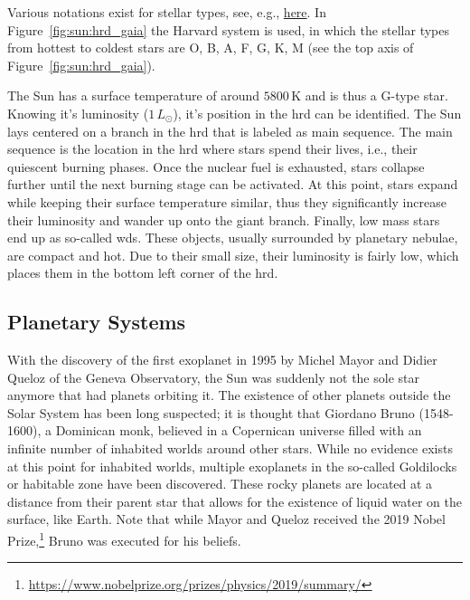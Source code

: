 Various notations exist for stellar types, see, e.g., \href{https://en.wikipedia.org/wiki/Stellar_classification}{here}. In Figure~\ref{fig:sun:hrd_gaia} the Harvard system is used, in which the stellar types from hottest to coldest stars are O, B, A, F, G, K, M (see the top axis of Figure~\ref{fig:sun:hrd_gaia}).

The Sun has a surface temperature of around $5800$\,K and is thus a G-type star. Knowing it's luminosity ($1\,L_\odot$), it's position in the \ac{hrd} can be identified. The Sun lays centered on a branch in the \ac{hrd} that is labeled as main sequence. The main sequence is the location in the \ac{hrd} where stars spend their lives, i.e., their quiescent burning phases. Once the nuclear fuel is exhausted, stars collapse further until the next burning stage can be activated. At this point, stars expand while keeping their surface temperature similar, thus they significantly increase their luminosity and wander up onto the giant branch. Finally, low mass stars end up as so-called \acp{wd}. These objects, usually surrounded by planetary nebulae, are compact and hot. Due to their small size, their luminosity is fairly low, which places them in the bottom left corner of the \ac{hrd}.


\subsection{Planetary Systems}

With the discovery of the first exoplanet in 1995 by Michel Mayor and Didier Queloz of the Geneva Observatory, the Sun was suddenly not the sole star anymore that had planets orbiting it. The existence of other planets outside the Solar System has been long suspected; it is thought that Giordano Bruno (1548-1600), a Dominican monk, believed in a Copernican universe filled with an infinite number of inhabited worlds around other stars. While no evidence exists at this point for inhabited worlds, multiple exoplanets in the so-called Goldilocks or habitable zone have been discovered. These rocky planets are located at a distance from their parent star that allows for the existence of liquid water on the surface, like Earth. Note that while Mayor and Queloz received the 2019 Nobel Prize,\footnote{\url{https://www.nobelprize.org/prizes/physics/2019/summary/}} Bruno was executed for his beliefs. 

